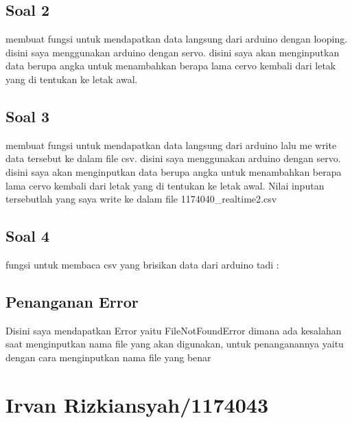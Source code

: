 	

	\subsection{Soal 2}
	membuat fungsi untuk mendapatkan data langsung dari arduino dengan looping. disini saya menggunakan arduino dengan servo. disini saya akan menginputkan data berupa angka untuk menambahkan berapa lama cervo kembali dari letak yang di tentukan ke letak awal.

	

	\subsection{Soal 3}
	membuat fungsi untuk mendapatkan data langsung dari arduino lalu me write data tersebut ke dalam file csv. disini saya menggunakan arduino dengan servo. disini saya akan menginputkan data berupa angka untuk menambahkan berapa lama cervo kembali dari letak yang di tentukan ke letak awal. Nilai inputan tersebutlah yang saya  write ke dalam file 1174040\_realtime2.csv

	

	\subsection{Soal 4}
	
	fungsi untuk membaca csv yang brisikan data dari arduino tadi :

	

	\subsection{Penanganan Error}
	Disini saya mendapatkan Error yaitu FileNotFoundError dimana ada kesalahan saat menginputkan nama file yang akan digunakan, untuk penanganannya yaitu dengan cara menginputkan nama file yang benar 

	
	
\section{Irvan Rizkiansyah/1174043}
